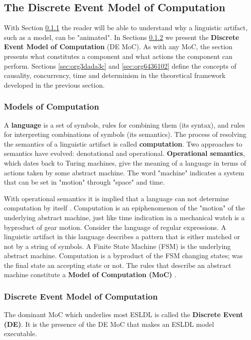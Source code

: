 \documentclass[11pt]{article}
\begin{document}
\subsection{The Discrete Event Model of Computation}
\label{sec:org409ed59}
With Section \ref{sec:org49af62f} the reader will be able to understand why a linguistic artifact, such as a model, can be "animated".
In Sections \ref{sec:org8a25c11} we present the \textbf{Discrete Event Model of Computation} (DE MoC).
As with any MoC, the section presents what constitutes a component and what actions the component can perform.
Sections \ref{sec:org3dada3c} and \ref{sec:org6436102} define the concepts of causality, concurrency, time and determinism in the theoretical framework developed in the previous section.

\subsubsection{Models of Computation}
\label{sec:org49af62f}
A \textbf{language} is a set of symbols, rules for combining them (its syntax), and rules for interpreting combinations of symbols (its semantics). 
The process of resolving the semantics of a linguistic artifact is called \textbf{computation}.
Two approaches to semantics have evolved: denotational and operational.
\textbf{Operational semantics}, which dates back to Turing machines, give the meaning of a language in terms of actions taken by some abstract machine. 
The word "machine" indicates a system that can be set in "motion" through "space" and time.

With operational semantics it is implied that a language can not determine computation by itself \cite{Jantsch2005}. 
Computation is an epiphenomenon of the "motion" of the underlying abstract machine, just like time indication in a mechanical watch is a byproduct of gear motion.
Consider the language of regular expressions.
A linguistic artifact in this language describes a pattern that is either matched or not by a string of symbols.
A Finite State Machine (FSM) is the underlying abstract machine.
Computation is a byproduct of the FSM changing states; was the final state an accepting state or not.
The rules that describe an abstract machine constitute a \textbf{Model of Computation (MoC)} \cite{Edwards1997}.

\subsubsection{Discrete Event Model of Computation}
\label{sec:org8a25c11}
The dominant MoC which underlies most ESLDL is called the \textbf{Discrete Event (DE)}.
It is the presence of the DE MoC that makes an ESLDL model executable.
\end{document}
